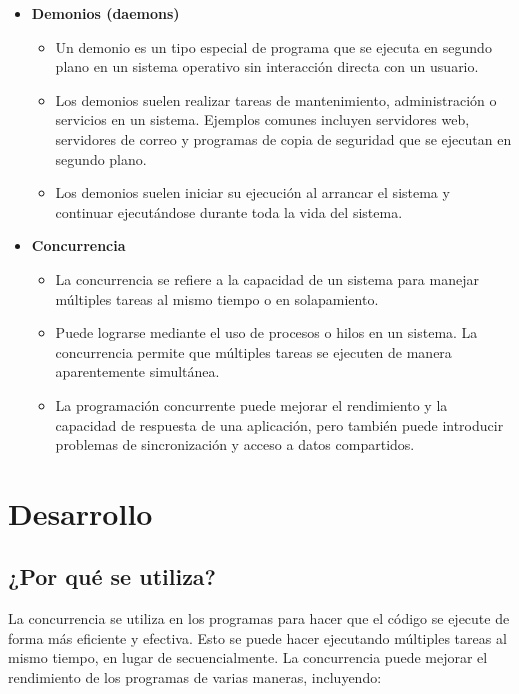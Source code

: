 \documentclass{dense_template}
\begin{document}
\begin{itemize}
\begin{itemize}
    \end{itemize}
    \item \textbf{Demonios (daemons)}
    \begin{itemize}
        \item Un demonio es un tipo especial de programa que se ejecuta en segundo plano en un sistema operativo sin interacción directa con un usuario.
    \end{itemize}
    \begin{itemize}
        \item Los demonios suelen realizar tareas de mantenimiento, administración o servicios en un sistema. Ejemplos comunes incluyen servidores web, servidores de correo y programas de copia de seguridad que se ejecutan en segundo plano.
    \end{itemize}
    \begin{itemize}
        \item Los demonios suelen iniciar su ejecución al arrancar el sistema y continuar ejecutándose durante toda la vida del sistema.
    \end{itemize}
    \item \textbf{Concurrencia}
    \begin{itemize}
        \item La concurrencia se refiere a la capacidad de un sistema para manejar múltiples tareas al mismo tiempo o en solapamiento.
    \end{itemize}
    \begin{itemize}
        \item Puede lograrse mediante el uso de procesos o hilos en un sistema. La concurrencia permite que múltiples tareas se ejecuten de manera aparentemente simultánea.
    \end{itemize}
    \begin{itemize}
        \item La programación concurrente puede mejorar el rendimiento y la capacidad de respuesta de una aplicación, pero también puede introducir problemas de sincronización y acceso a datos compartidos.
    \end{itemize}
\end{itemize}

\pagebreak
\section{Desarrollo}
\subsection{¿Por qué se utiliza?}
La concurrencia se utiliza en los programas para hacer que el código se ejecute de forma más eficiente y efectiva. Esto se puede hacer ejecutando múltiples tareas al mismo tiempo, en lugar de secuencialmente. La concurrencia puede mejorar el rendimiento de los programas de varias maneras, incluyendo:
\end{document}
